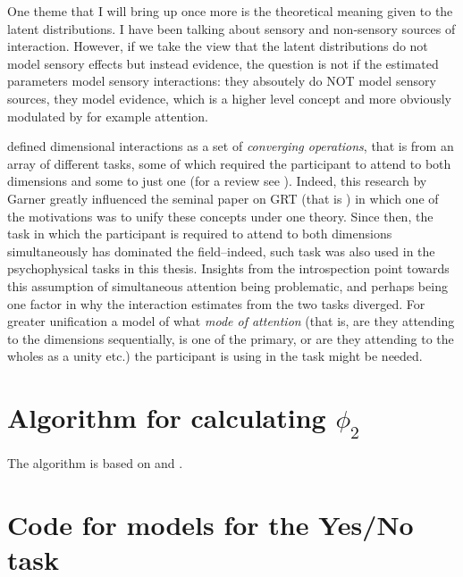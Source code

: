 \documentclass{article}\usepackage{knitr}
\begin{document}
One theme that I will bring up once more is the theoretical meaning given to the latent distributions. I have been talking about sensory and non-sensory sources of interaction. However, if we take the view that the latent distributions do not model sensory effects but instead evidence, the question is not if the estimated parameters model sensory interactions: they absoutely do NOT model sensory sources, they model evidence, which is a higher level concept and more obviously modulated by for example attention.

\citet{garner1974} defined dimensional interactions as a set of \textit{converging operations}, that is from an array of different tasks, some of which required the participant to attend to both dimensions and some to just one (for a review see \citet{burns2014}). Indeed, this research by Garner greatly influenced the seminal paper on GRT (that is \citet{ashby1986}) in which one of the motivations was to unify these concepts under one theory. Since then, the task in which the participant is required to attend to both dimensions simultaneously has dominated the field--indeed, such task was also used in the psychophysical tasks in this thesis. Insights from the introspection point towards this assumption of simultaneous attention being problematic, and perhaps being one factor in why the interaction estimates from the two tasks diverged. For greater unification a model of what \textit{mode of attention} (that is, are they attending to the dimensions sequentially, is one of the primary, or are they attending to the wholes as a unity etc.) the participant is using in the task might be needed.


\clearpage



\newpage


\appendix
{}

\section{Algorithm for calculating \texorpdfstring{$\phi_2$}{bivariate CDF}}

The algorithm is based on \citet{boys1989} and \citet{pan2017}.



\newpage
\section{Code for models for the Yes/No task}
\end{document}
